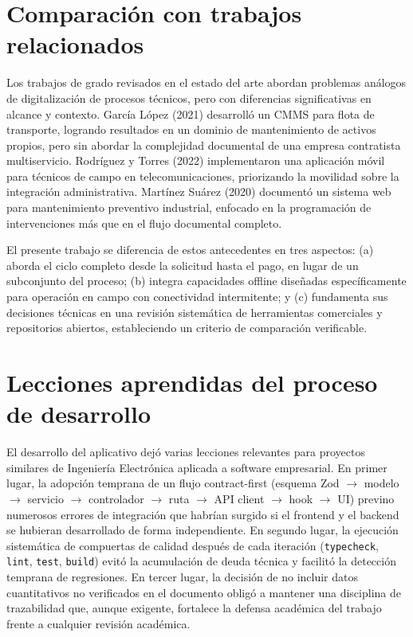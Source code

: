 \section{Comparación con trabajos relacionados}
\label{sec:discusion-comparacion}

Los trabajos de grado revisados en el estado del arte abordan problemas análogos de digitalización de procesos técnicos, pero con diferencias significativas en alcance y contexto. García López (2021) desarrolló un CMMS para flota de transporte, logrando resultados en un dominio de mantenimiento de activos propios, pero sin abordar la complejidad documental de una empresa contratista multiservicio. Rodríguez y Torres (2022) implementaron una aplicación móvil para técnicos de campo en telecomunicaciones, priorizando la movilidad sobre la integración administrativa. Martínez Suárez (2020) documentó un sistema web para mantenimiento preventivo industrial, enfocado en la programación de intervenciones más que en el flujo documental completo.

El presente trabajo se diferencia de estos antecedentes en tres aspectos: (a) aborda el ciclo completo desde la solicitud hasta el pago, en lugar de un subconjunto del proceso; (b) integra capacidades offline diseñadas específicamente para operación en campo con conectividad intermitente; y (c) fundamenta sus decisiones técnicas en una revisión sistemática de herramientas comerciales y repositorios abiertos, estableciendo un criterio de comparación verificable.

\section{Lecciones aprendidas del proceso de desarrollo}
\label{sec:lecciones-aprendidas}

El desarrollo del aplicativo dejó varias lecciones relevantes para proyectos similares de Ingeniería Electrónica aplicada a software empresarial. En primer lugar, la adopción temprana de un flujo contract-first (esquema Zod $\rightarrow$ modelo $\rightarrow$ servicio $\rightarrow$ controlador $\rightarrow$ ruta $\rightarrow$ API client $\rightarrow$ hook $\rightarrow$ UI) previno numerosos errores de integración que habrían surgido si el frontend y el backend se hubieran desarrollado de forma independiente. En segundo lugar, la ejecución sistemática de compuertas de calidad después de cada iteración (\texttt{typecheck}, \texttt{lint}, \texttt{test}, \texttt{build}) evitó la acumulación de deuda técnica y facilitó la detección temprana de regresiones. En tercer lugar, la decisión de no incluir datos cuantitativos no verificados en el documento obligó a mantener una disciplina de trazabilidad que, aunque exigente, fortalece la defensa académica del trabajo frente a cualquier revisión académica.

